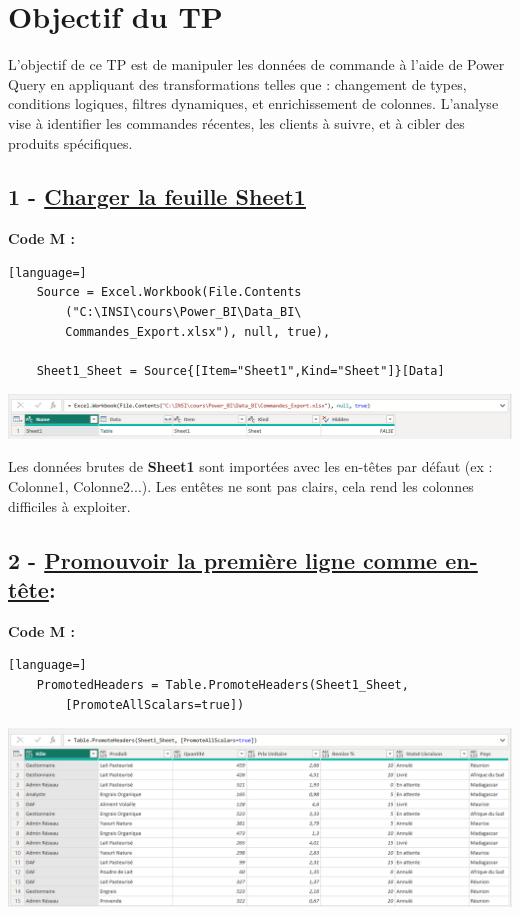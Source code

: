 \documentclass[12pt,a4paper]{article}
\begin{document}
	\newpage

    \section*{Objectif du TP}
    L'objectif de ce TP est de manipuler les donn\'ees de commande \`a l'aide de Power Query en appliquant des transformations telles que : changement de types, conditions logiques, filtres dynamiques, et enrichissement de colonnes. L'analyse vise \`a identifier les commandes r\'ecentes, les clients \`a suivre, et \`a cibler des produits sp\'ecifiques.


    \subsection*{\textbf{1 - \underline{Charger la feuille Sheet1}} }
    \textbf{Code M :}
    \begin{lstlisting}[language=]
    Source = Excel.Workbook(File.Contents
        ("C:\INSI\cours\Power_BI\Data_BI\
        Commandes_Export.xlsx"), null, true),

    Sheet1_Sheet = Source{[Item="Sheet1",Kind="Sheet"]}[Data]
    \end{lstlisting}
    \includegraphics[width=\textwidth]{etape1.png}


     Les données brutes de \textbf{Sheet1} sont importées avec les en-têtes par défaut (ex : Colonne1, Colonne2...). Les entêtes ne sont pas clairs, cela rend les colonnes difficiles à exploiter.

    \subsection*{\textbf{2 - \underline{Promouvoir la premi\`ere ligne comme en-t\^ete}:}} 
    \textbf{Code M :}
    \begin{lstlisting}[language=]
    PromotedHeaders = Table.PromoteHeaders(Sheet1_Sheet, 
        [PromoteAllScalars=true])
    \end{lstlisting}
    \includegraphics[width=\textwidth]{etape2.png}
\end{document}
